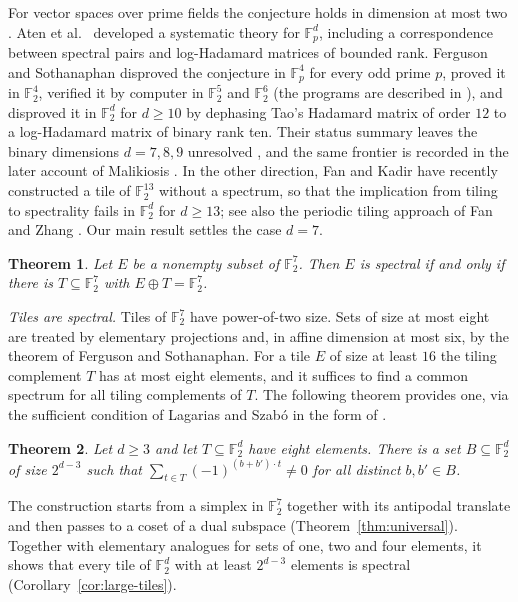 \documentclass[11pt]{amsart}
\newtheorem{theorem}{Theorem}[section]
\theoremstyle{definition}
\theoremstyle{remark}
\numberwithin{equation}{section}
\numberwithin{table}{section}
\newcommand{\F}{\mathbb{F}}
\begin{document}
For vector spaces over prime fields the conjecture holds in dimension at most two \cite{IMP17}. Aten et al.\ \cite{AAB17} developed a systematic theory for $\F_p^d$, including a correspondence between spectral pairs and log-Hadamard matrices of bounded rank. Ferguson and Sothanaphan \cite{FS20} disproved the conjecture in $\F_p^4$ for every odd prime $p$, proved it in $\F_2^4$, verified it by computer in $\F_2^5$ and $\F_2^6$ (the programs are described in \cite{FS19add}), and disproved it in $\F_2^d$ for $d\ge10$ by dephasing Tao's Hadamard matrix of order $12$ to a log-Hadamard matrix of binary rank ten. Their status summary leaves the binary dimensions $d=7,8,9$ unresolved \cite[Section~1]{FS20}, and the same frontier is recorded in the later account of Malikiosis \cite{Mal24}. In the other direction, Fan and Kadir \cite{FK26} have recently constructed a tile of $\F_2^{13}$ without a spectrum, so that the implication from tiling to spectrality fails in $\F_2^d$ for $d\ge13$; see also the periodic tiling approach of Fan and Zhang \cite{FZ24}. Our main result settles the case $d=7$.

\begin{theorem}\label{thm:main}
Let $E$ be a nonempty subset of $\F_2^7$. Then $E$ is spectral if and only if there is $T\subseteq\F_2^7$ with $E\oplus T=\F_2^7$.
\end{theorem}

\emph{Tiles are spectral.} Tiles of $\F_2^7$ have power-of-two size. Sets of size at most eight are treated by elementary projections and, in affine dimension at most six, by the theorem of Ferguson and Sothanaphan. For a tile $E$ of size at least $16$ the tiling complement $T$ has at most eight elements, and it suffices to find a common spectrum for all tiling complements of $T$. The following theorem provides one, via the sufficient condition of Lagarias and Szab\'o \cite{LS01} in the form of \cite[Proposition~4]{FMM06}.

\begin{theorem}\label{thm:universal-intro}
Let $d\ge3$ and let $T\subseteq\F_2^d$ have eight elements. There is a set $B\subseteq\F_2^d$ of size $2^{d-3}$ such that $\sum_{t\in T}(-1)^{(b+b')\cdot t}\ne0$ for all distinct $b,b'\in B$.
\end{theorem}

The construction starts from a simplex in $\F_2^7$ together with its antipodal translate and then passes to a coset of a dual subspace (Theorem~\ref{thm:universal}). Together with elementary analogues for sets of one, two and four elements, it shows that every tile of $\F_2^d$ with at least $2^{d-3}$ elements is spectral (Corollary~\ref{cor:large-tiles}).
\end{document}
